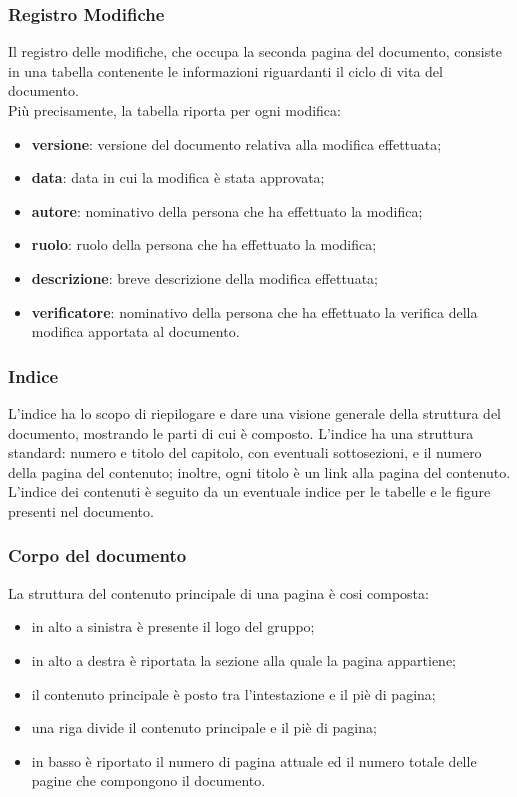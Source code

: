 \subsubsection{Registro Modifiche}\label{ProcessiDiSupportoDocumentazioneStrutturaGeneraleDeiDocumentiRegistroModifiche}
Il registro delle modifiche, che occupa la seconda pagina del documento, consiste in una tabella contenente le informazioni riguardanti il ciclo di vita del documento.
\\Più precisamente, la tabella riporta per ogni modifica:
\begin{itemize}
\item \textbf{versione}: versione del documento relativa alla modifica effettuata;
\item \textbf{data}: data in cui la modifica è stata approvata;
\item \textbf{autore}: nominativo della persona che ha effettuato la modifica;
\item \textbf{ruolo}: ruolo della persona che ha effettuato la modifica;
\item \textbf{descrizione}: breve descrizione della modifica effettuata;
\item \textbf{verificatore}: nominativo della persona che ha effettuato la verifica della modifica apportata al documento.

		
				
\end{itemize}
\subsubsection{Indice}\label{ProcessiDiSupportoDocumentazioneStrutturaGeneraleDeiDocumentiIndice}
L'indice ha lo scopo di riepilogare e dare una visione generale della struttura del documento, mostrando le parti di cui è composto. L'indice ha una struttura standard: numero e titolo del capitolo, con eventuali sottosezioni, e il numero della pagina del contenuto; inoltre, ogni titolo è un link alla pagina del contenuto. L'indice dei contenuti è seguito da un eventuale indice per le tabelle e le figure presenti nel documento.
\subsubsection{Corpo del documento}\label{ProcessiDiSupportoDocumentazioneStrutturaGeneraleDeiDocumentiCorpoDelDocumento}
La struttura del contenuto principale di una pagina è cosi composta:
\begin{itemize}
\item in alto a sinistra è presente il logo del gruppo;
	\item in alto a destra è riportata la sezione alla quale la pagina appartiene;
		\item il contenuto principale è posto tra l'intestazione e il piè di pagina;
			\item una riga divide il contenuto principale e il piè di pagina;
				\item in basso è riportato il numero di pagina attuale ed il numero totale delle pagine che compongono il documento.
\end{itemize}
